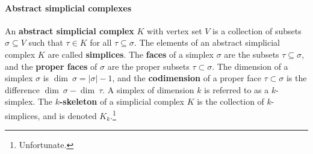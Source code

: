 
%

\paragraph{Abstract simplicial complexes}


An \textbf{abstract simplicial complex} $K$ with vertex set $V$ is a collection of subsets $\sigma\subseteq V$ such that $\tau\in K$ for all $\tau\subseteq \sigma$.
The elements of an abstract simplicial complex $K$ are called \textbf{simplices}.
The \textbf{faces} of a simplex $\sigma$ are the subsets $\tau\subseteq\sigma$, and the \textbf{proper faces} of $\sigma$ are the proper subsets $\tau\subset \sigma$.
The dimension of a simplex $\sigma$ is $\dim~\sigma = |\sigma|-1$, and the \textbf{codimension} of a proper face $\tau\subset \sigma$ is the difference $\dim~\sigma - \dim~\tau$.
A simplex of dimension $k$ is referred to as a $k$-simplex.
The \textbf{$k$-skeleton} of a simplicial complex $K$ is the collection of $k$-simplices, and is denoted $K_k$.\footnote{Unfortunate.}

